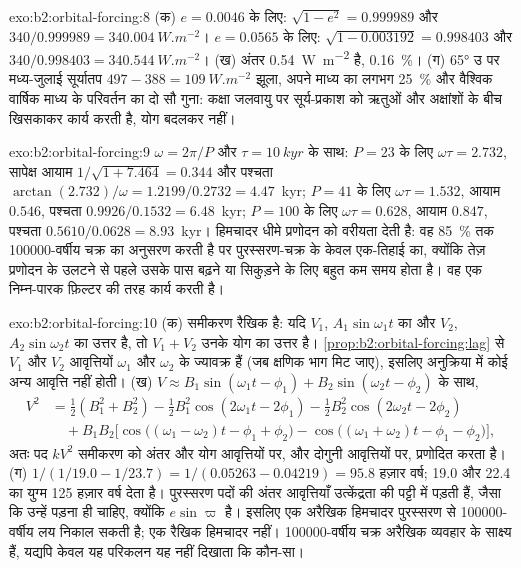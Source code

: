 \begin{solution}{exo:b2:orbital-forcing:8}
(क) $e = 0.0046$ के लिए: $\sqrt{1 - e^2} = 0.999989$ और $340/0.999989 = \qty{340.004}{W.m^{-2}}$।
$e = 0.0565$ के लिए: $\sqrt{1 - 0.003192} = 0.998403$ और $340/0.998403 = \qty{340.544}{W.m^{-2}}$। (ख)
अंतर \qty{0.54}{W.m^{-2}} है, \qty{0.16}{\percent}। (ग) \ang{65} उ पर मध्य-जुलाई सूर्यातप
$497 - 388 = \qty{109}{W.m^{-2}}$ झूला, अपने माध्य का लगभग \qty{25}{\percent} और वैश्विक वार्षिक माध्य के
परिवर्तन का दो सौ गुना: कक्षा जलवायु पर सूर्य-प्रकाश को ऋतुओं और अक्षांशों के बीच
खिसकाकर कार्य करती है, योग बदलकर नहीं।
\end{solution}

\begin{solution}{exo:b2:orbital-forcing:9}
$\omega = 2\pi/P$ और $\tau = \qty{10}{kyr}$ के साथ: $P = 23$ के लिए $\omega\tau = 2.732$, सापेक्ष
आयाम $1/\sqrt{1 + 7.464} = 0.344$ और पश्चता $\arctan(2.732)/\omega = 1.2199/0.2732 = 4.47$~\unit{kyr};
$P = 41$ के लिए $\omega\tau = 1.532$, आयाम $0.546$, पश्चता $0.9926/0.1532 = 6.48$~\unit{kyr}; $P =
100$ के लिए $\omega\tau = 0.628$, आयाम $0.847$, पश्चता $0.5610/0.0628 = 8.93$~\unit{kyr}। हिमचादर
धीमे प्रणोदन को वरीयता देती है: वह \qty{85}{\percent} तक \num{100000}-वर्षीय चक्र का अनुसरण करती है पर
पुरस्सरण-चक्र के केवल एक-तिहाई का, क्योंकि तेज़ प्रणोदन के उलटने से पहले उसके पास बढ़ने या सिकुड़ने के लिए
बहुत कम समय होता है। वह एक निम्न-पारक फ़िल्टर की तरह कार्य करती है।
\end{solution}

\begin{solution}{exo:b2:orbital-forcing:10}
(क) समीकरण रैखिक है: यदि $V_1$, $A_1\sin\omega_1t$ का और $V_2$,
$A_2\sin\omega_2t$ का उत्तर है, तो $V_1 + V_2$ उनके योग का उत्तर है। \cref{prop:b2:orbital-forcing:lag} से $V_1$ और
$V_2$ आवृत्तियों $\omega_1$ और $\omega_2$ के ज्यावक्र हैं (जब क्षणिक भाग मिट जाए), इसलिए
अनुक्रिया में कोई अन्य आवृत्ति नहीं होती। (ख) $V \approx B_1\sin(\omega_1t - \phi_1) +
B_2\sin(\omega_2t - \phi_2)$ के साथ,
\[
\begin{aligned}
  V^2 &= \tfrac12(B_1^2 + B_2^2) - \tfrac12B_1^2\cos(2\omega_1t - 2\phi_1) -
  \tfrac12B_2^2\cos(2\omega_2t - 2\phi_2)\\
  &\quad + B_1B_2\bigl[\cos\bigl((\omega_1 - \omega_2)t - \phi_1 + \phi_2\bigr) -
  \cos\bigl((\omega_1 + \omega_2)t - \phi_1 - \phi_2\bigr)\bigr],
\end{aligned}
\]
अतः पद $kV^2$ समीकरण को अंतर और योग आवृत्तियों पर, और दोगुनी
आवृत्तियों पर, प्रणोदित करता है। (ग) $1/(1/19.0 - 1/23.7) = 1/(0.05263 - 0.04219) = 95.8$ हज़ार वर्ष; 19.0
और 22.4 का युग्म 125 हज़ार वर्ष देता है। पुरस्सरण पदों की अंतर आवृत्तियाँ उत्केंद्रता की पट्टी में
पड़ती हैं, जैसा कि उन्हें पड़ना ही चाहिए, क्योंकि  $e\sin\varpi$ है। इसलिए एक अरैखिक
हिमचादर पुरस्सरण से \num{100000}-वर्षीय लय निकाल सकती है; एक रैखिक हिमचादर
नहीं। \num{100000}-वर्षीय चक्र अरैखिक व्यवहार के साक्ष्य हैं, यद्यपि केवल यह परिकलन
यह नहीं दिखाता कि कौन-सा।
\end{solution}

